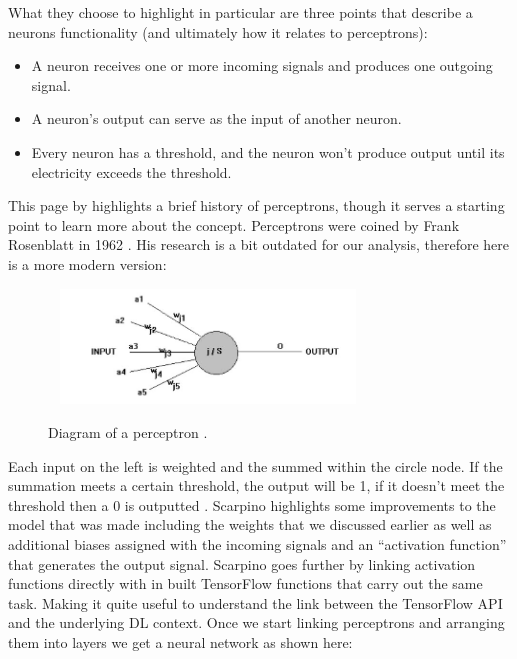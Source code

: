 \documentclass[12pt,a4paper]{report}
\begin{document}
What they choose to highlight in particular are three points that describe a neurons functionality (and ultimately how 
it relates to perceptrons):

\begin{itemize}
    \item A neuron receives one or more incoming signals and produces one outgoing signal.
    \item A neuron's output can serve as the input of another neuron.
    \item Every neuron has a threshold, and the neuron won't produce output until its electricity exceeds the threshold.
\end{itemize}

This page by \citet{anonpercep} highlights a brief history of perceptrons, though 
it serves a starting point to learn more about the concept. Perceptrons were coined by Frank Rosenblatt in 1962  
\citep{rosenblatt1961principles}. His research is a bit outdated for our analysis, therefore here is a 
more modern version:

\begin{figure}[h]\
    \centering
    \includegraphics[width=0.7\textwidth]{perceptron.jpg}
    \caption{Diagram of a perceptron \citep{anonpercep}.}
\end{figure}

Each input on the left is weighted and the summed within the circle node. If the summation meets a certain threshold, 
the output will be 1, if it doesn't meet the threshold then a 0 is outputted \citep{ScarpinoMatthew2018Tfd}. 
Scarpino highlights some 
improvements to the model that was made including the weights that we discussed earlier as well as additional biases 
assigned with the incoming signals and an “activation function” that generates the output signal. Scarpino goes further 
by linking activation functions directly with in built TensorFlow functions that carry out the same task. Making it 
quite useful to understand the link between the TensorFlow API and the underlying DL context. Once we start linking 
perceptrons and arranging them into layers we get a neural network as shown here:
\end{document}

